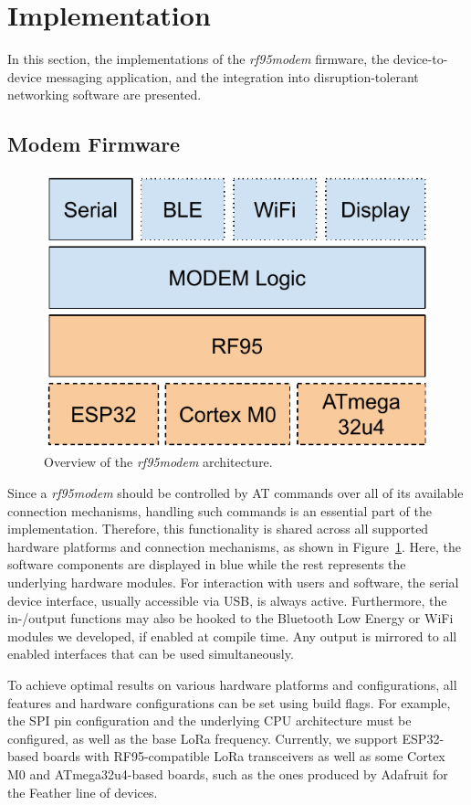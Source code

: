 \section{Implementation}
\label{hoechst2020lora:sec:impl}

In this section, the implementations of the \textit{rf95modem} firmware, the device-to-device messaging application, and the integration into disruption-tolerant networking software are presented.

\subsection{Modem Firmware}

\begin{figure}[ht!]
    \centering
    \includegraphics[width=.5\columnwidth]{gfx/rf95modem-arch.pdf}
    \caption{Overview of the \textit{rf95modem} architecture.}
    \label{hoechst2020lora:fig:rf95modem_arch}
\end{figure}

Since a \textit{rf95modem} should be controlled by AT commands over all of its available connection mechanisms, handling such commands is an essential part of the implementation. 
Therefore, this functionality is shared across all supported hardware platforms and connection mechanisms, as shown in Figure~\ref{hoechst2020lora:fig:rf95modem_arch}. 
Here, the software components are displayed in blue while the rest represents the underlying hardware modules.
For interaction with users and software, the serial device interface, usually accessible via USB, is always active. 
Furthermore, the in-/output functions may also be hooked to the Bluetooth Low Energy or WiFi modules we developed, if enabled at compile time. 
Any output is mirrored to all enabled interfaces that can be used simultaneously. 

To achieve optimal results on various  hardware platforms and configurations, all features and hardware configurations can be set using build flags.
For example, the SPI pin configuration and the underlying CPU architecture must be configured, as well as the base LoRa frequency. 
Currently, we support ESP32-based boards with RF95-compatible LoRa transceivers as well as some Cortex M0 and ATmega32u4-based boards, such as the ones produced by Adafruit for the Feather line of devices.

